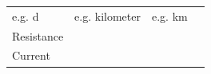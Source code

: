 \begin{enumerate}[noitemsep, label=\textbf{\arabic*}. ]
{{\begin{center}
\begin{tabular}[t]{|l|l|l|l|}
    
        e.g. d &
    
    
        e.g. kilometer &
    
    
        e.g. km%
     \tabularnewline\cline{1-1}\cline{2-2}\cline{3-3}\cline{4-4}
    
    
        Resistance &
    
    
         &
    
    
         &
    
    
     \tabularnewline\cline{1-1}\cline{2-2}\cline{3-3}\cline{4-4}
    
    
        Current &
    

\end{tabular}
\end{center}}}
\end{enumerate}
